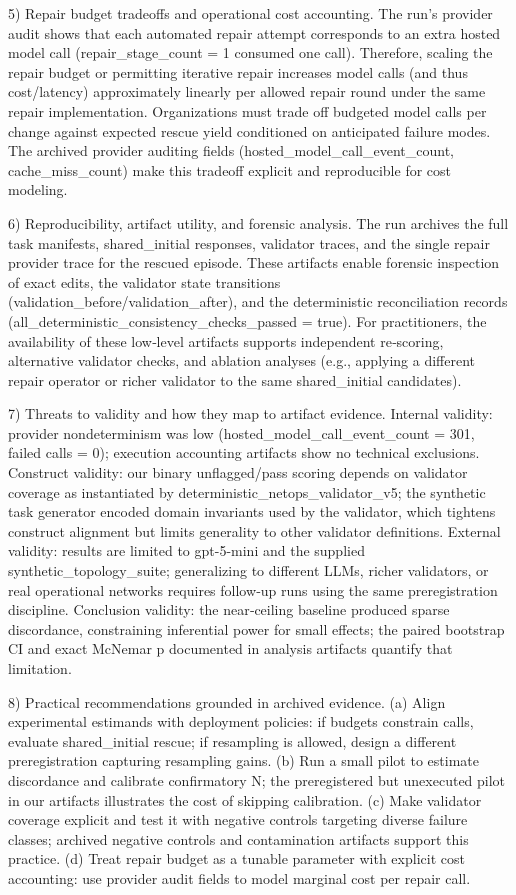 \documentclass[conference]{IEEEtran}
\begin{document}
5) Repair budget tradeoffs and operational cost accounting. The run's provider audit shows that each automated repair attempt corresponds to an extra hosted model call (repair\_stage\_count = 1 consumed one call). Therefore, scaling the repair budget or permitting iterative repair increases model calls (and thus cost/latency) approximately linearly per allowed repair round under the same repair implementation. Organizations must trade off budgeted model calls per change against expected rescue yield conditioned on anticipated failure modes. The archived provider auditing fields (hosted\_model\_call\_event\_count, cache\_miss\_count) make this tradeoff explicit and reproducible for cost modeling.

6) Reproducibility, artifact utility, and forensic analysis. The run archives the full task manifests, shared\_initial responses, validator traces, and the single repair provider trace for the rescued episode. These artifacts enable forensic inspection of exact edits, the validator state transitions (validation\_before/validation\_after), and the deterministic reconciliation records (all\_deterministic\_consistency\_checks\_passed = true). For practitioners, the availability of these low‑level artifacts supports independent re‑scoring, alternative validator checks, and ablation analyses (e.g., applying a different repair operator or richer validator to the same shared\_initial candidates).

7) Threats to validity and how they map to artifact evidence. Internal validity: provider nondeterminism was low (hosted\_model\_call\_event\_count = 301, failed calls = 0); execution accounting artifacts show no technical exclusions. Construct validity: our binary unflagged/pass scoring depends on validator coverage as instantiated by deterministic\_netops\_validator\_v5; the synthetic task generator encoded domain invariants used by the validator, which tightens construct alignment but limits generality to other validator definitions. External validity: results are limited to gpt-5-mini and the supplied synthetic\_topology\_suite; generalizing to different LLMs, richer validators, or real operational networks requires follow‑up runs using the same preregistration discipline. Conclusion validity: the near‑ceiling baseline produced sparse discordance, constraining inferential power for small effects; the paired bootstrap CI and exact McNemar p documented in analysis artifacts quantify that limitation.

8) Practical recommendations grounded in archived evidence. (a) Align experimental estimands with deployment policies: if budgets constrain calls, evaluate shared\_initial rescue; if resampling is allowed, design a different preregistration capturing resampling gains. (b) Run a small pilot to estimate discordance and calibrate confirmatory N; the preregistered but unexecuted pilot in our artifacts illustrates the cost of skipping calibration. (c) Make validator coverage explicit and test it with negative controls targeting diverse failure classes; archived negative controls and contamination artifacts support this practice. (d) Treat repair budget as a tunable parameter with explicit cost accounting: use provider audit fields to model marginal cost per repair call.
\end{document}
